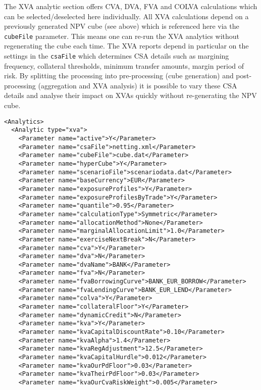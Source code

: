 {The XVA analytic section offers CVA, DVA, FVA and COLVA calculations which can be selected/deselected here
individually. All XVA calculations depend on a previously generated NPV cube (see above) which is referenced here via
the {\tt cubeFile} parameter. This means one can re-run the XVA analytics without regenerating the cube each time. The
XVA reports depend in particular on the settings in the {\tt csaFile} which determines CSA details such as margining
frequency, collateral thresholds, minimum transfer amounts, margin period of risk. By splitting the processing into
pre-processing (cube generation) and post-processing (aggregation and XVA analysis) it is possible to vary these CSA
details and analyse their impact on XVAs quickly without re-generating the NPV cube.

\begin{listing}[H]
\begin{verbatim}
<Analytics>
  <Analytic type="xva">
    <Parameter name="active">Y</Parameter>
    <Parameter name="csaFile">netting.xml</Parameter>
    <Parameter name="cubeFile">cube.dat</Parameter>
    <Parameter name="hyperCube">Y</Parameter>
    <Parameter name="scenarioFile">scenariodata.dat</Parameter>
    <Parameter name="baseCurrency">EUR</Parameter>
    <Parameter name="exposureProfiles">Y</Parameter>
    <Parameter name="exposureProfilesByTrade">Y</Parameter>
    <Parameter name="quantile">0.95</Parameter>
    <Parameter name="calculationType">Symmetric</Parameter>      
    <Parameter name="allocationMethod">None</Parameter>    
    <Parameter name="marginalAllocationLimit">1.0</Parameter>
    <Parameter name="exerciseNextBreak">N</Parameter>
    <Parameter name="cva">Y</Parameter>
    <Parameter name="dva">N</Parameter>
    <Parameter name="dvaName">BANK</Parameter>
    <Parameter name="fva">N</Parameter>
    <Parameter name="fvaBorrowingCurve">BANK_EUR_BORROW</Parameter>
    <Parameter name="fvaLendingCurve">BANK_EUR_LEND</Parameter>
    <Parameter name="colva">Y</Parameter>
    <Parameter name="collateralFloor">Y</Parameter>
    <Parameter name="dynamicCredit">N</Parameter>
    <Parameter name="kva">Y</Parameter>
    <Parameter name="kvaCapitalDiscountRate">0.10</Parameter>
    <Parameter name="kvaAlpha">1.4</Parameter>
    <Parameter name="kvaRegAdjustment">12.5</Parameter>
    <Parameter name="kvaCapitalHurdle">0.012</Parameter>
    <Parameter name="kvaOurPdFloor">0.03</Parameter>
    <Parameter name="kvaTheirPdFloor">0.03</Parameter>
    <Parameter name="kvaOurCvaRiskWeight">0.005</Parameter>

\end{verbatim}
\end{listing}}
